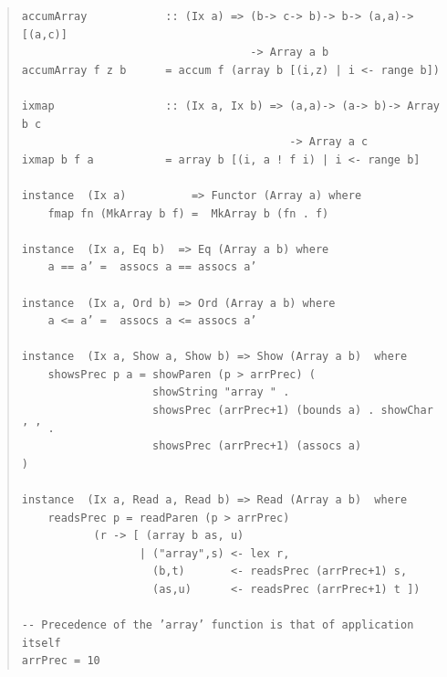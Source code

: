 \begin{quote}
{\begin{verbatim}
accumArray            :: (Ix a) => (b-> c-> b)-> b-> (a,a)-> [(a,c)]
                                   -> Array a b
accumArray f z b      = accum f (array b [(i,z) | i <- range b])

ixmap                 :: (Ix a, Ix b) => (a,a)-> (a-> b)-> Array b c
                                         -> Array a c
ixmap b f a           = array b [(i, a ! f i) | i <- range b]

instance  (Ix a)          => Functor (Array a) where
    fmap fn (MkArray b f) =  MkArray b (fn . f)

instance  (Ix a, Eq b)  => Eq (Array a b) where
    a == a’ =  assocs a == assocs a’

instance  (Ix a, Ord b) => Ord (Array a b) where
    a <= a’ =  assocs a <= assocs a’

instance  (Ix a, Show a, Show b) => Show (Array a b)  where
    showsPrec p a = showParen (p > arrPrec) (
                    showString "array " .
                    showsPrec (arrPrec+1) (bounds a) . showChar ’ ’ .
                    showsPrec (arrPrec+1) (assocs a)                  )

instance  (Ix a, Read a, Read b) => Read (Array a b)  where
    readsPrec p = readParen (p > arrPrec)
           (r -> [ (array b as, u)
                  | ("array",s) <- lex r,
                    (b,t)       <- readsPrec (arrPrec+1) s,
                    (as,u)      <- readsPrec (arrPrec+1) t ])

-- Precedence of the ’array’ function is that of application itself
arrPrec = 10
\end{verbatim}}
\end{quote}